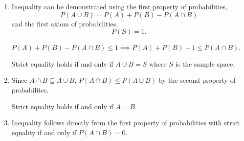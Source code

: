 \begin{enumerate}[label=(\alph*)]

\item Inequality can be demonstrated using the first property of probabilities,
$$P(A \cup B) = P(A) + P(B) - P(A \cap B)$$ and the first axiom of probabilities,
$$P(S) = 1.$$

$P(A) + P(B) - P(A \cap B) \leq 1 \implies P(A) + P(B) - 1 \leq P(A \cap B)$. 

Strict equality holds if and only if $A \cup B = S$ where $S$ is the sample space.

\item Since $A \cap B \subseteq A \cup B$, $P(A \cap B) \leq P(A \cup B)$ by
 the second property of probabilites.

Strict equality holds if and only if $A = B.$

\item Inequality follows directly from the first property of probabilities
 with strict equality if and only if $P(A \cap B) = 0.$

\end{enumerate}